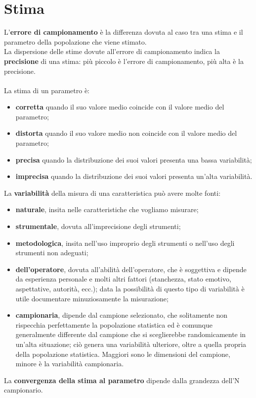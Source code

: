 \documentclass[drafts, 10pt]{book}
\begin{document}
\section{Stima}
L'\textbf{errore di campionamento} è la differenza dovuta al caso tra una stima e il parametro della popolazione che viene stimato.
\\
La dispersione delle stime dovute all'errore di campionamento indica la \textbf{precisione} di una stima: più piccolo è l'errore di campionamento, più alta è la precisione.
\\
\\
La stima di un parametro è:
\begin{itemize}
    \item \textbf{corretta} quando il suo valore medio coincide con il valore medio del parametro;
    \item \textbf{distorta} quando il suo valore medio non coincide con il valore medio del parametro;
    \item \textbf{precisa} quando la distribuzione dei suoi valori presenta una bassa variabilità;
    \item \textbf{imprecisa} quando la distribuzione dei suoi valori presenta un’alta variabilità.
\end{itemize}
La \textbf{variabilità} della misura di una caratteristica può avere molte fonti:
\begin{itemize}
    \item \textbf{naturale}, insita nelle caratteristiche che vogliamo misurare; 
    \item \textbf{strumentale}, dovuta all’imprecisione degli strumenti; 
    \item \textbf{metodologica}, insita nell’uso improprio degli strumenti o nell’uso degli strumenti non adeguati; 
    \item \textbf{dell’operatore}, dovuta all’abilità dell’operatore, che è soggettiva e dipende da esperienza personale e molti altri fattori (stanchezza, stato emotivo, aspettative, autorità, ecc.); data la possibilità di questo tipo di variabilità è utile documentare minuziosamente la misurazione;
    \item \textbf{campionaria}, dipende dal campione selezionato, che solitamente non rispecchia perfettamente la popolazione statistica ed è comunque generalmente differente dal campione che si sceglierebbe randomicamente in un’alta situazione; ciò genera una variabilità ulteriore, oltre a quella propria della popolazione statistica. Maggiori sono le dimensioni del campione, minore è la variabilità campionaria.
\end{itemize}
La \textbf{convergenza della stima al parametro} dipende dalla grandezza dell’N campionario.
\end{document}
